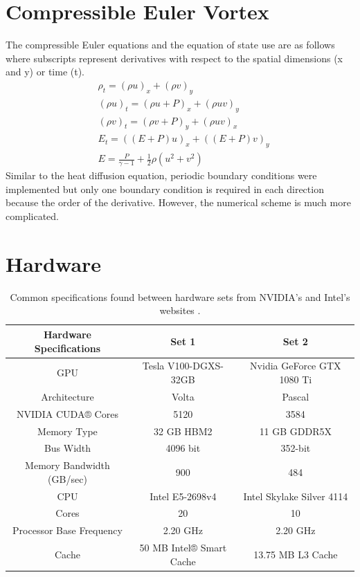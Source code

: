 \documentclass[journal,article,submit,moreauthors,pdftex]{Definitions/mdpi}
\def\oldCPU{Intel Skylake Silver 4114} %
\def\oldGPU{Nvidia GeForce GTX 1080 Ti}
\def\newCPU{Intel E5-2698v4} %
\def\newGPU{Tesla V100-DGXS-32GB}
\begin{document}
\begin{paracol}{2}
\section{Compressible Euler Vortex}
\label{Compressible-Euler}
The compressible Euler equations and the equation of state use are as follows where subscripts represent derivatives with respect to the spatial dimensions (x and y) or time (t).
\begin{align*}
    &\rho_t  = (\rho u)_x + (\rho v)_y \\ 
    &(\rho u)_t  = (\rho u+P)_x + (\rho u v)_y\\
    &(\rho v)_t  = (\rho v+P)_y + (\rho u v)_x\\
    &E_t = ((E+P)u)_x+((E+P)v)_y\\
    &E = \frac{P}{\gamma -1}+\frac{1}{2}\rho(u^2+v^2)
\end{align*}
Similar to the heat diffusion equation, periodic boundary conditions were implemented but only one boundary condition is required in each direction because the order of the derivative. However, the numerical scheme is much more complicated.







\section{Hardware}
\label{Hardware}
\begin{table}
\begin{center}
\begin{tabular}{ |c|c|c| } 

 \hline
 Hardware Specifications & Set 1 & Set 2 \\
 \hline
 GPU & \newGPU{} & \oldGPU{} \\
 Architecture   & Volta &  Pascal \\
 NVIDIA CUDA® Cores  & 5120 &  3584 \\
 Memory Type   & 32 GB HBM2 &  11 GB GDDR5X \\
 Bus Width    & 4096 bit &  352-bit \\
 Memory Bandwidth (GB/sec)  & 900 &  484 \\ 
 \hline
 CPU & \newCPU{} & \oldCPU{} \\ 
 Cores & 20 & 10 \\
 Processor Base Frequency & 2.20 GHz & 2.20 GHz \\
 Cache & 50 MB Intel® Smart Cache & 13.75 MB L3 Cache\\
 \hline
\end{tabular}
\end{center}
\caption{\label{hardwareTable} Common specifications found between hardware sets from NVIDIA's and Intel's websites \cite{Intel123550,Intel91753,GeForceGeForce,NVIDIANVIDIA}.}
\end{table}

\end{paracol}
\end{document}
